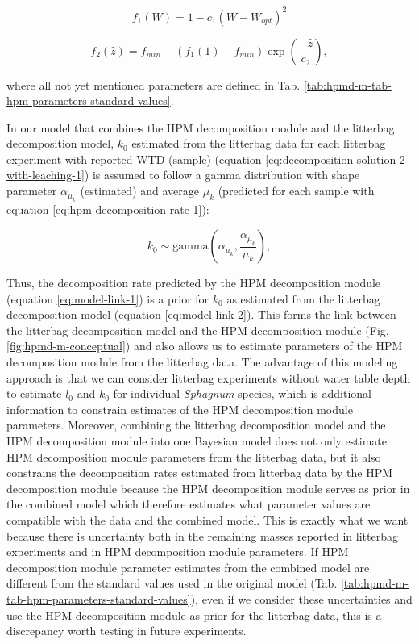 \documentclass[esd, manuscript]{copernicus}
\begin{document}
\begin{equation}
f_1(W) = 1 - c_1(W - W_{opt})^2
\label{eq:hpm-moisture-modifier-1}
\end{equation}

\begin{equation}
f_2(\hat{z}) = f_{min} + (f_1(1) - f_{min}) \exp \left(\frac{-\hat{z}}{c_2} \right),
\label{eq:hpm-moisture-modifier-2}
\end{equation}

where all not yet mentioned parameters are defined in Tab. \ref{tab:hpmd-m-tab-hpm-parameters-standard-values}.

In our model that combines the HPM decomposition module and the litterbag decomposition model, \(k_0\) estimated from the litterbag data for each litterbag experiment with reported WTD (sample) (equation \eqref{eq:decomposition-solution-2-with-leaching-1}) is assumed to follow a gamma distribution with shape parameter \(\alpha_{\mu_k}\) (estimated) and average \(\mu_k\) (predicted for each sample with equation \eqref{eq:hpm-decomposition-rate-1}):

\begin{equation}
k_0 \sim \text{gamma}\left(\alpha_{\mu_k}, \frac{\alpha_{\mu_k}}{\mu_k} \right),
\label{eq:model-link-1}
\end{equation}

Thus, the decomposition rate predicted by the HPM decomposition module (equation \eqref{eq:model-link-1}) is a prior for \(k_0\) as estimated from the litterbag decomposition model (equation \eqref{eq:model-link-2}). This forms the link between the litterbag decomposition model and the HPM decomposition module (Fig. \ref{fig:hpmd-m-conceptual}) and also allows us to estimate parameters of the HPM decomposition module from the litterbag data. The advantage of this modeling approach is that we can consider litterbag experiments without water table depth to estimate \(l_0\) and \(k_0\) for individual \emph{Sphagnum} species, which is additional information to constrain estimates of the HPM decomposition module parameters. Moreover, combining the litterbag decomposition model and the HPM decomposition module into one Bayesian model does not only estimate HPM decomposition module parameters from the litterbag data, but it also constrains the decomposition rates estimated from litterbag data by the HPM decomposition module because the HPM decomposition module serves as prior in the combined model which therefore estimates what parameter values are compatible with the data and the combined model. This is exactly what we want because there is uncertainty both in the remaining masses reported in litterbag experiments and in HPM decomposition module parameters. If HPM decomposition module parameter estimates from the combined model are different from the standard values used in the original model (Tab. \ref{tab:hpmd-m-tab-hpm-parameters-standard-values}), even if we consider these uncertainties and use the HPM decomposition module as prior for the litterbag data, this is a discrepancy worth testing in future experiments.
\end{document}
